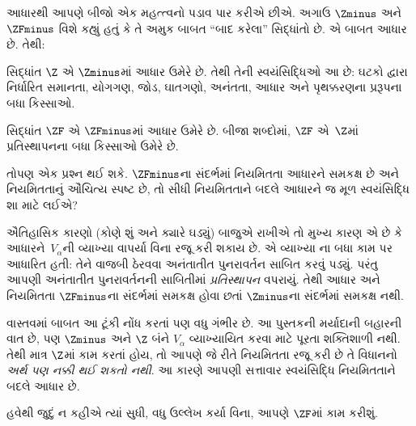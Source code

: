 \documentclass[../../../include/open-logic-section]{subfiles}
\begin{document}

આધારથી આપણે બીજો એક મહત્ત્વનો પડાવ પાર કરીએ છીએ. અગાઉ
$\Zminus$ અને $\ZFminus$ વિશે કહ્યું હતું કે તે
અમુક બાબત ``બાદ કરેલા'' સિદ્ધાંતો છે. એ બાબત આધાર છે. તેથી:

\begin{defn}
સિદ્ધાંત $\Z$ એ $\Zminus$માં આધાર ઉમેરે છે. તેથી તેની
સ્વયંસિદ્ધિઓ આ છે: ઘટકો દ્વારા નિર્ધારિત સમાનતા, યોગગણ, જોડ,
ઘાતગણો, અનંતતા, આધાર અને પૃથક્કરણના પ્રરૂપના બધા કિસ્સાઓ.

સિદ્ધાંત $\ZF$ એ $\ZFminus$માં આધાર ઉમેરે છે. બીજા શબ્દોમાં,
$\ZF$ એ~$\Z$માં પ્રતિસ્થાપનના બધા કિસ્સાઓ ઉમેરે છે.
\end{defn}

તોપણ એક પ્રશ્ન થઈ શકે. $\ZFminus$ના સંદર્ભમાં નિયમિતતા
આધારને સમકક્ષ છે અને નિયમિતતાનું ઔચિત્ય સ્પષ્ટ છે, તો સીધી
નિયમિતતાને બદલે આધારને જ મૂળ સ્વયંસિદ્ધિ શા માટે લઈએ?

ઐતિહાસિક કારણો (કોણે શું અને ક્યારે ઘડ્યું) બાજુએ રાખીએ તો
મુખ્ય કારણ એ છે કે આધારને~$V_\alpha$ની વ્યાખ્યા વાપર્યા વિના
રજૂ કરી શકાય છે. એ વ્યાખ્યા
ના બધા કામ પર આધારિત હતી: તેને
વાજબી ઠેરવવા અનંતાતીત પુનરાવર્તન સાબિત કરવું પડ્યું.
પરંતુ આપણી અનંતાતીત પુનરાવર્તનની સાબિતીમાં
\emph{પ્રતિસ્થાપન} વપરાયું. તેથી આધાર અને નિયમિતતા
$\ZFminus$ના સંદર્ભમાં સમકક્ષ હોવા છતાં $\Zminus$ના
સંદર્ભમાં સમકક્ષ નથી.

વાસ્તવમાં બાબત આ ટૂંકી નોંધ કરતાં પણ વધુ ગંભીર છે.
આ પુસ્તકની મર્યાદાની બહારની વાત છે, પણ $\Zminus$ અને
$\Z$ બંને $V_\alpha$ વ્યાખ્યાયિત કરવા માટે પૂરતા શક્તિશાળી
નથી. તેથી માત્ર $\Z$માં કામ કરતાં હોય, તો આપણે જે રીતે
નિયમિતતા રજૂ કરી છે તે વિધાનનો \emph{અર્થ પણ નક્કી થઈ શકતો નથી}.
આ કારણે આપણી સત્તાવાર સ્વયંસિદ્ધિ નિયમિતતાને બદલે આધાર છે.

હવેથી જુદું ન કહીએ ત્યાં સુધી, વધુ ઉલ્લેખ કર્યા વિના,
આપણે $\ZF$માં કામ કરીશું.
\end{document}
